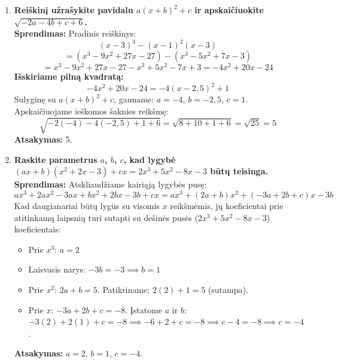 \documentclass[11pt,a4paper]{article}
\begin{document}
\begin{enumerate}[label=\textbf{\arabic*.}]
    \vspace{0.5cm}
    \item \textbf{Reiškinį užrašykite pavidalu $a(x+b)^2 + c$ ir apskaičiuokite $\sqrt{-2a-4b+c+6}$.}
    \\ \textbf{Sprendimas:} Pradinis reiškinys:
    \[ (x-3)^3 - (x-1)^2(x-3) \]
    \[ = (x^3-9x^2+27x-27) - (x^3-5x^2+7x-3) \]
    \[ = x^3-9x^2+27x-27-x^3+5x^2-7x+3 = -4x^2+20x-24 \]
    \textbf{Išskiriame pilną kvadratą:}
    \[ -4x^2+20x-24 = -4(x-2,5)^2+1 \]
    Sulyginę su $a(x+b)^2+c$, gauname: $a=-4$, $b=-2,5$, $c=1$.
    Apskaičiuojame ieškomos šaknies reikšmę:
    \[ \sqrt{-2(-4) - 4(-2,5) + 1 + 6} = \sqrt{8 + 10 + 1 + 6} = \sqrt{25} = 5 \]
    \textbf{Atsakymas:} 5.

    \vspace{0.5cm}
    \item \textbf{Raskite parametrus $a$, $b$, $c$, kad lygybė $(ax+b)(x^2+2x-3) + cx = 2x^3+5x^2-8x-3$ būtų teisinga.}
    \\ \textbf{Sprendimas:} Atskliaudžiame kairiąją lygybės pusę:
    \[ ax^3 + 2ax^2 - 3ax + bx^2 + 2bx - 3b + cx = ax^3 + (2a+b)x^2 + (-3a+2b+c)x - 3b \]
    Kad daugianariai būtų lygūs su visomis $x$ reikšmėmis, jų koeficientai prie atitinkamų laipsnių turi sutapti su dešinės pusės ($2x^3+5x^2-8x-3$) koeficientais:
    \begin{itemize}
        \item Prie $x^3$: \quad $a = 2$
        \item Laisvasis narys: \quad $-3b = -3 \implies b = 1$
        \item Prie $x^2$: \quad $2a + b = 5$. Patikriname: $2(2) + 1 = 5$ (sutampa).
        \item Prie $x$: \quad $-3a + 2b + c = -8$. Įstatome $a$ ir $b$: \\
        $-3(2) + 2(1) + c = -8 \implies -6 + 2 + c = -8 \implies c - 4 = -8 \implies c = -4$.
    \end{itemize}
    \textbf{Atsakymas:} $a = 2$, $b = 1$, $c = -4$.
\end{enumerate}
\end{document}
